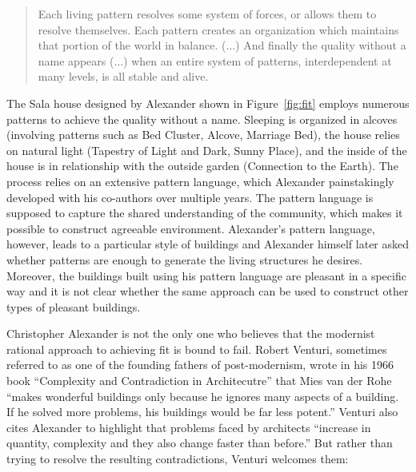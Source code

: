 \begin{quote}
Each living pattern resolves some system of forces, or allows them to resolve themselves.
Each pattern creates an organization which maintains that portion of the world in balance.
(...) And finally the quality without a name appears (...) when an entire system of patterns,
interdependent at many levels, is all stable and alive.
\end{quote}

The Sala house designed by Alexander shown in Figure~\ref{fig:fit} employs numerous patterns to achieve
the quality without a name. Sleeping is organized in alcoves (involving patterns such as Bed Cluster,
Alcove, Marriage Bed), the house relies on natural light (Tapestry of Light and Dark, Sunny Place),
and the inside of the house is in relationship with the outside garden (Connection to the Earth).
The process relies on an extensive pattern language, which Alexander painstakingly developed with
his co-authors over multiple years. The pattern language is supposed to capture the shared
understanding of the community, which makes it possible to construct agreeable environment.
Alexander's pattern language, however, leads to a particular style of buildings and Alexander
himself later asked whether patterns are enough to generate the living structures he desires.
Moreover, the buildings built using his pattern language are pleasant in a specific way and it is
not clear whether the same approach can be used to construct other types of pleasant
buildings.

Christopher Alexander is not the only one who believes that the modernist rational approach
to achieving fit is bound to fail. Robert Venturi, sometimes referred to as one of the founding
fathers of post-modernism, wrote in his 1966 book ``Complexity and
Contradiction in Architecutre'' that Mies van der Rohe ``makes wonderful buildings only because
he ignores many aspects of a building. If he solved more problems, his buildings would be far
less potent.'' Venturi also cites Alexander
to highlight that problems faced by architects ``increase in quantity, complexity and they also
change faster than before.''
But rather than trying to resolve the resulting contradictions, Venturi welcomes them:

